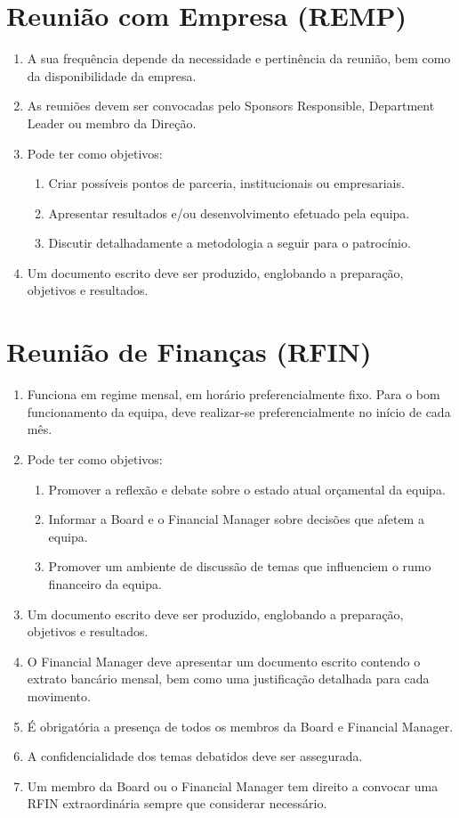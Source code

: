 \section{Reunião com Empresa (REMP)}
\begin{enumerate}
  \item A sua frequência depende da necessidade e pertinência da reunião, bem como da disponibilidade da empresa.
  \item As reuniões devem ser convocadas pelo Sponsors Responsible, Department Leader ou membro da Direção.
  \item Pode ter como objetivos:
  \begin{enumerate}
    \item Criar possíveis pontos de parceria, institucionais ou empresariais.
    \item Apresentar resultados e/ou desenvolvimento efetuado pela equipa.
    \item Discutir detalhadamente a metodologia a seguir para o patrocínio.
  \end{enumerate}
  \item Um documento escrito deve ser produzido, englobando a preparação, objetivos e resultados.
\end{enumerate}

\section{Reunião de Finanças (RFIN)}
\begin{enumerate}
  \item Funciona em regime mensal, em horário preferencialmente fixo. Para o bom funcionamento da equipa, deve realizar-se preferencialmente no início de cada mês.
  \item Pode ter como objetivos:
  \begin{enumerate}
    \item Promover a reflexão e debate sobre o estado atual orçamental da equipa.
    \item Informar a Board e o Financial Manager sobre decisões que afetem a equipa.
    \item Promover um ambiente de discussão de temas que influenciem o rumo financeiro da equipa.
  \end{enumerate}
  \item Um documento escrito deve ser produzido, englobando a preparação, objetivos e resultados.
  \item O Financial Manager deve apresentar um documento escrito contendo o extrato bancário mensal, bem como uma justificação detalhada para cada movimento.
  \item É obrigatória a presença de todos os membros da Board e Financial Manager.
  \item A confidencialidade dos temas debatidos deve ser assegurada.
  \item Um membro da Board ou o Financial Manager tem direito a convocar uma RFIN extraordinária sempre que considerar necessário.
\end{enumerate}

